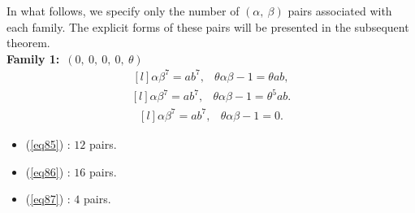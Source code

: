 \documentclass[12pt,a4wide, reqno]{amsart}
\theoremstyle{definition}
\theoremstyle{remark}
\numberwithin{equation}{section}
\begin{document}
     In what follows, we specify only the number of $(\alpha,~\beta)$ pairs associated with each family. The explicit forms of these pairs will be presented in the subsequent theorem.\\
\textbf{Family 1:}~$(0,~0,~0,~0,~\theta)$ 
\begin{equation}\label{eq85}
    \begin{matrix*}[l]
         \alpha \beta ^7=ab^7, & \theta\alpha\beta-1=\theta ab,
    \end{matrix*}
\end{equation}
\begin{equation}\label{eq86}
    \begin{matrix*}[l]
         \alpha \beta ^7=ab^7, & \theta\alpha\beta-1=\theta^5ab.
    \end{matrix*}
\end{equation}
\begin{equation}\label{eq87}
    \begin{matrix*}[l]
         \alpha \beta ^7=ab^7, & \theta\alpha\beta-1=0.
    \end{matrix*}
\end{equation}
\begin{itemize}
    \item 
    (\ref{eq85}) : $12$ pairs.
    \item 
    (\ref{eq86}) : $16$ pairs.
    \item 
    (\ref{eq87}) : $4$ pairs.
    \end{itemize}
    
\end{document}
